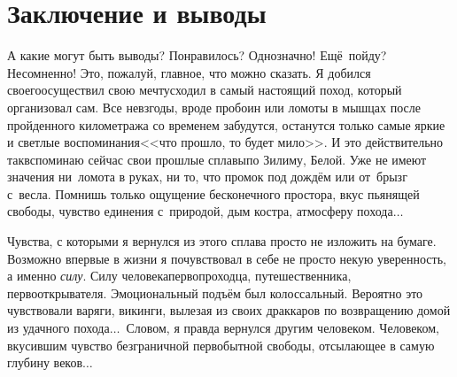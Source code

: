 \chapter{Заключение и выводы}

А какие могут быть выводы? Понравилось? Однозначно! Ещё~пойду? Несомненно! Это, пожалуй, главное, что можно сказать. Я добился своего\mdash осуществил свою мечту\mdash сходил в самый настоящий поход, который организовал сам. Все невзгоды, вроде пробоин или ломоты в мышцах после пройденного километража со временем забудутся, останутся только самые яркие и светлые воспоминания\mdash <<что прошло, то будет мило>>. И это действительно так\mdash вспоминаю сейчас свои прошлые сплавы\mdash по Зилиму, Белой. Уже не имеют значения ни~ломота в руках, ни то, что промок под дождём или от~брызг с~весла. Помнишь только ощущение бесконечного простора, вкус пьянящей свободы, чувство единения с~природой, дым костра, атмосферу похода$\ldots$ 

Чувства, с которыми я вернулся из этого сплава просто не изложить на бумаге. Возможно впервые в жизни я почувствовал в себе не просто некую уверенность, а именно \textit{силу}. Силу человека\sdash первопроходца, путешественника, первооткрывателя. Эмоциональный подъём был колоссальный. Вероятно это чувствовали варяги, викинги, вылезая из своих драккаров по возвращению домой из удачного похода$\ldots$~Словом, я правда вернулся другим человеком. Человеком, вкусившим чувство безграничной первобытной свободы, отсылающее в самую глубину веков$\ldots$

